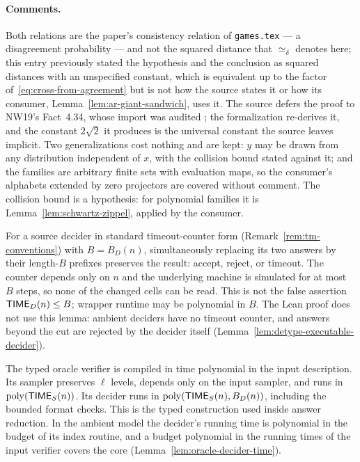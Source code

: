 \paragraph{Comments.} Both relations are the paper's consistency relation of \texttt{games.tex}
--- a disagreement probability --- and not the squared distance that $\simeq_\delta$ denotes here;
this entry previously stated the hypothesis and the conclusion as squared distances with an
unspecified constant, which is equivalent up to the factor of~\eqref{eq:cross-from-agreement} but
is not how the source states it or how its consumer, Lemma~\ref{lem:ar-giant-sandwich}, uses it.
The source defers the proof to NW19's Fact~4.34, whose import was audited \cite{AuditSync26};
the formalization re-derives it, and the constant $2\sqrt{2}$ it produces is the universal
constant the source leaves implicit. Two generalizations cost nothing and are kept: $y$ may be
drawn from any distribution independent of $x$, with the collision bound stated against it; and
the families are arbitrary finite sets with evaluation maps, so the consumer's alphabets extended
by zero projectors are covered without comment. The collision bound is a hypothesis: for
polynomial families it is Lemma~\ref{lem:schwartz-zippel}, applied by the consumer.

\begin{lemma}
\label{lem:timeout-truncation-interface}
For a source decider in standard timeout-counter form
(Remark~\ref{rem:tm-conventions}) with $B=B_D(n)$,
simultaneously replacing its two answers by their length-$B$ prefixes
preserves the result: accept, reject, or timeout. The counter depends only
on $n$ and the underlying machine is simulated for at most $B$ steps, so
none of the changed cells can be read. This is not the false assertion
$\mathsf{TIME}_D(n)\leq B$; wrapper runtime may be polynomial in $B$.
The Lean proof does not use this lemma: ambient deciders have no timeout counter, and
answers beyond the cut are rejected by the decider itself
(Lemma~\ref{lem:detype-executable-decider}).
\end{lemma}

\begin{lemma}
\label{lem:oracle-effective-interface}
\leanok
The typed oracle verifier is compiled in time polynomial in the input
description. Its sampler preserves $\ell$ levels, depends only on the
input sampler, and runs in $\mathrm{poly}(\mathsf{TIME}_S(n))$. Its decider runs in
$\mathrm{poly}(\mathsf{TIME}_S(n),B_D(n))$, including the bounded format checks.
This is the typed construction used inside answer reduction.
In the ambient model the decider's running time is polynomial in the budget of its index
routine, and a budget polynomial in the running times of the input verifier covers the core
(Lemma~\ref{lem:oracle-decider-time}).
\end{lemma}

